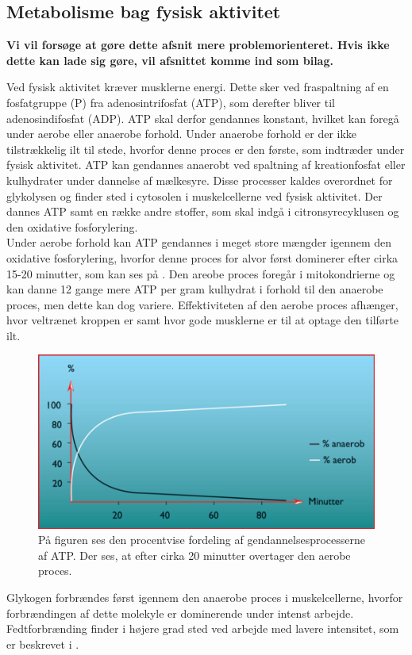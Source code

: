 \subsection{Metabolisme bag fysisk aktivitet}
{\color{red}\textbf{Vi vil forsøge at gøre dette afsnit mere problemorienteret. Hvis ikke dette kan lade sig gøre, vil afsnittet komme ind som bilag.}}


Ved fysisk aktivitet kræver musklerne energi. Dette sker ved fraspaltning af en fosfatgruppe (P) fra adenosintrifosfat (ATP), som derefter bliver til adenosindifosfat (ADP). ATP skal derfor gendannes konstant, hvilket kan foregå under aerobe eller anaerobe forhold. Under anaerobe forhold er der ikke tilstrækkelig ilt til stede, hvorfor denne proces er den første, som indtræder under fysisk aktivitet. ATP kan gendannes anaerobt ved spaltning af kreationfosfat eller kulhydrater under dannelse af mælkesyre. Disse processer kaldes overordnet for glykolysen og finder sted i cytosolen i muskelcellerne ved fysisk aktivitet. Der dannes ATP samt en række andre stoffer, som skal indgå i citronsyrecyklusen og den oxidative fosforylering.\citep{Martini2012,Engelbreth2010} \\
Under aerobe forhold kan ATP gendannes i meget store mængder igennem den oxidative fosforylering, hvorfor denne proces for alvor først dominerer efter cirka 15-20 minutter, som kan ses på . Den areobe proces foregår i mitokondrierne og kan danne 12 gange mere ATP per gram kulhydrat i forhold til den anaerobe proces, men dette kan dog variere. Effektiviteten af den aerobe proces afhænger, hvor veltrænet kroppen er samt hvor gode musklerne er til at optage den tilførte ilt.\citep{Engelbreth2010,Martini2012,Stanfield2013} 
\begin{figure}[H]
	\centering
	\includegraphics[scale=0.65]{figures/aProblemanalyse/Metabolisme.png}
	\caption{På figuren ses den procentvise fordeling af gendannelsesprocesserne af ATP. Der ses, at efter cirka 20 minutter overtager den aerobe proces.\citep{Engelbreth2010}}
	\label{fig:Metabolisme}
\end{figure}
Glykogen forbrændes først igennem den anaerobe proces i muskelcellerne, hvorfor forbrændingen af dette molekyle er dominerende under intenst arbejde. Fedtforbrænding finder i højere grad sted ved arbejde med lavere intensitet, som er beskrevet i .\citep{Martini2012,Stanfield2013,Engelbreth2010}